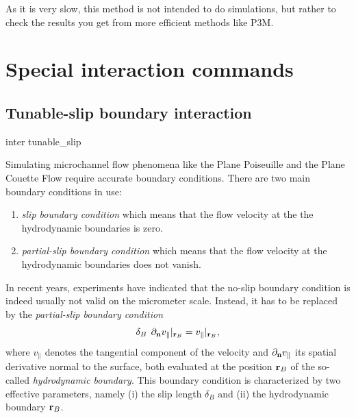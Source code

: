 As it is very slow, this method is not intended to do simulations,
but rather to check the results you get from more efficient methods
like P3M.
  
\section{Special interaction commands}
\label{sec:inter-other}

\subsection{Tunable-slip boundary interaction}\label{sec:tunableSlip}
\begin{essyntax}
  inter  
  tunable_slip    
    
  \begin{features}
  \end{features}
\end{essyntax}
Simulating microchannel flow phenomena like the Plane Poiseuille and
the Plane Couette Flow require accurate boundary conditions. There are
two main boundary conditions in use:

\begin{enumerate} 
\item \emph{slip boundary condition} which means that the flow
  velocity at the the hydrodynamic boundaries is zero.
\item \emph{partial-slip boundary condition} which means that the flow 
  velocity at the hydrodynamic boundaries does not vanish.
\end{enumerate}

In recent years, experiments have indicated that the no-slip boundary
condition is indeed usually not valid on the micrometer
scale. Instead, it has to be replaced by the {\em {partial-slip
    boundary condition}}
\begin{displaymath}
\delta_B \: \: \partial_{{\bf n}} v_{\parallel}|_{{\bf r}_B} =
v_{\parallel}|_{{\bf r}_B},
\end{displaymath}
where $v_{\parallel}$ denotes the tangential component of the velocity
and $\partial_{{\bf n}} v_{\parallel}$ its spatial derivative normal
to the surface, both evaluated at the position ${\bf r}_B$ of the
so-called {\em hydrodynamic boundary}.  This boundary condition is
characterized by two effective parameters, namely (i) the slip length
$\delta_B$ and (ii) the hydrodynamic boundary ${\bf r}_B$.

